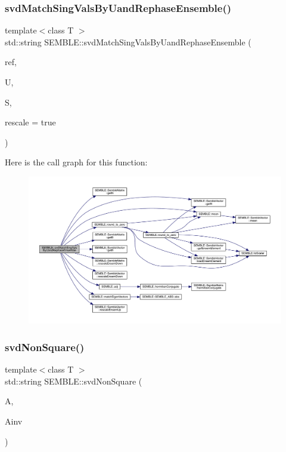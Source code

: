 \subsubsection{\texorpdfstring{svdMatchSingValsByUandRephaseEnsemble()}{svdMatchSingValsByUandRephaseEnsemble()}\hspace{0.1cm}{\footnotesize\ttfamily [2/2]}}
{\footnotesize\ttfamily template$<$class T $>$ \\
std\+::string S\+E\+M\+B\+L\+E\+::svd\+Match\+Sing\+Vals\+By\+Uand\+Rephase\+Ensemble (\begin{DoxyParamCaption}\item[{const itpp\+::\+Mat$<$ T $>$ \&}]{ref,  }\item[{\mbox{\hyperlink{structSEMBLE_1_1SembleMatrix}{Semble\+Matrix}}$<$ T $>$ \&}]{U,  }\item[{\mbox{\hyperlink{structSEMBLE_1_1SembleVector}{Semble\+Vector}}$<$ double $>$ \&}]{S,  }\item[{const bool}]{rescale = {\ttfamily true} }\end{DoxyParamCaption})}

Here is the call graph for this function\+:
\nopagebreak
\begin{figure}[H]
\begin{center}
\leavevmode
\includegraphics[width=350pt]{d7/dfd/namespaceSEMBLE_a61ca40cf973c57e2fb720ed03c22fcd6_cgraph}
\end{center}
\end{figure}
\mbox{\label{namespaceSEMBLE_a866079e585b77c937ef4241e6c2f72be}} 
\subsubsection{\texorpdfstring{svdNonSquare()}{svdNonSquare()}}
{\footnotesize\ttfamily template$<$class T $>$ \\
std\+::string S\+E\+M\+B\+L\+E\+::svd\+Non\+Square (\begin{DoxyParamCaption}\item[{const \mbox{\hyperlink{structSEMBLE_1_1SembleMatrix}{Semble\+Matrix}}$<$ T $>$ \&}]{A,  }\item[{\mbox{\hyperlink{structSEMBLE_1_1SembleMatrix}{Semble\+Matrix}}$<$ T $>$ \&}]{Ainv }\end{DoxyParamCaption})}

